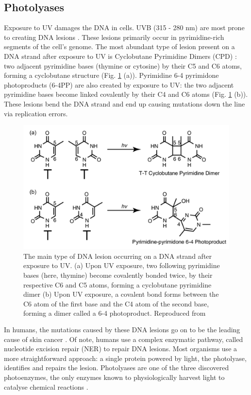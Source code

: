 \subsection{Photolyases}

Exposure to UV damages the DNA in cells. UVB (315 - 280 nm) are most prone to creating DNA lesions \parencite{oakUVSkinPhotocarcinogenesis2018}. These lesions primarily occur in pyrimidine-rich segments of the cell's genome. The most abundant type of lesion present on a DNA strand after exposure to UV is Cyclobutane Pyrimidine Dimers (CPD) \parencite{oakUVSkinPhotocarcinogenesis2018}: two adjacent pyrimidine bases (thymine or cytosine) by their C5 and C6 atoms, forming a cyclobutane structure (Fig. \ref{fig:damagetype} (a)). Pyrimidine 6-4 pyrimidone photoproducts (6-4PP) are also created by exposure to UV: the two adjacent pyrimidine bases become linked covalently by their C4 and C6 atoms (Fig. \ref{fig:damagetype} (b)). These lesions bend the DNA strand and end up causing mutations down the line via replication errors. 

\begin{figure}[H]
  \centering
  \includegraphics[width=\textwidth]{images/cracry/damagetypes.pdf}
  \hfill
  \caption{The main type of DNA lesion occurring on a DNA strand after exposure to UV. (a) Upon UV exposure, two following pyrimidine bases (here, thymine) become covalently bonded twice, by their respective C6 and C5 atoms, forming a cyclobutane pyrimidine dimer (b) Upon UV exposure, a covalent bond forms between the C6 atom of the first base and the C4 atom of the second base, forming a dimer called a 6-4 photoproduct. Reproduced from \parencite{oakUVSkinPhotocarcinogenesis2018}}\label{fig:damagetype}
\end{figure}
In humans, the mutations caused by these DNA lesions go on to be the leading cause of skin cancer \parencite{cadetUltravioletRadiationmediatedDamage2005}. Of note, humans use a complex enzymatic pathway, called nucleotide excision repair (NER) to repair DNA lesions. Most organisms use a more straightforward approach: a single protein powered by light, the photolyase, identifies and repairs the lesion. Photolyases are one of the three discovered photoenzymes, the only enzymes known to physiologically harvest light to catalyse chemical reactions \parencite{bjornPhotoenzymesRelatedTopics2018}. 

